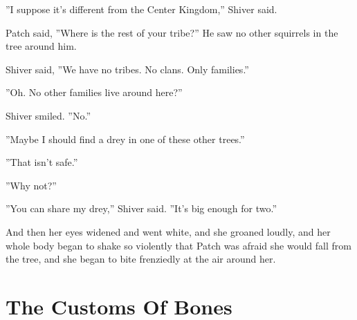 \documentclass[12pt]{book}
\begin{document}
''I suppose it's different from the Center Kingdom,'' Shiver said.\par
Patch said, ''Where is the rest of your tribe?'' He saw no other squirrels in the tree around him.\par
Shiver said, ''We have no tribes. No clans. Only families.''\par
''Oh. No other families live around here?''\par
Shiver smiled. ''No.''\par
''Maybe I should find a drey in one of these other trees.''\par
''That isn't safe.''\par
''Why not?''\par
''You can share my drey,'' Shiver said. ''It's big enough for two.''\par
And then her eyes widened and went white, and she groaned loudly, and her whole body began to shake so violently that Patch was afraid she would fall from the tree, and she began to bite frenziedly at the air around her.\par

\section{The Customs Of Bones}
\end{document}
